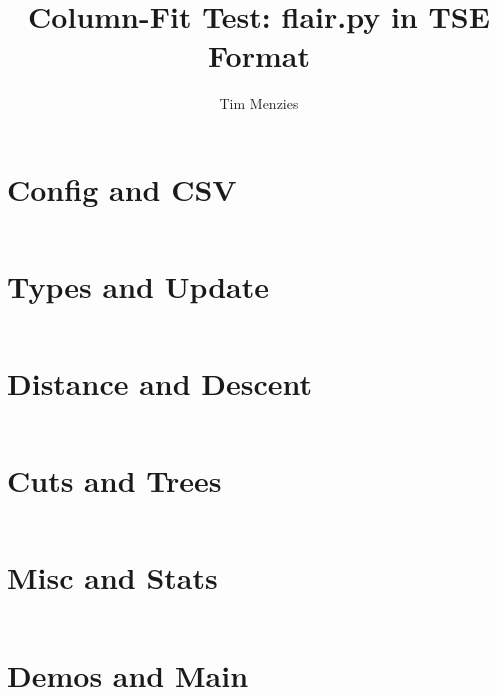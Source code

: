 \documentclass[10pt,journal,compsoc]{IEEEtran}
\begin{document}
\title{Column-Fit Test: flair.py in TSE Format}
\author{Tim Menzies}
\maketitle

\section{Config and CSV}
\inputminted{python}{sec1_config.py}

\section{Types and Update}
\inputminted{python}{sec2_types.py}

\section{Distance and Descent}
\inputminted{python}{sec3_dist.py}

\section{Cuts and Trees}
\inputminted{python}{sec4_cuts.py}

\section{Misc and Stats}
\inputminted{python}{sec5_misc.py}

\section{Demos and Main}
\inputminted{python}{sec6_demos.py}
\end{document}
